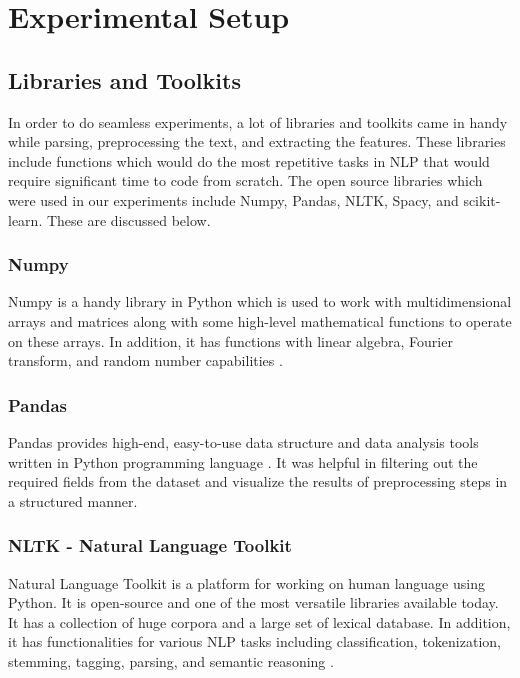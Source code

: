 

    \chapter{Experimental Setup}
    \label{chap:experiment_setup}
    \section{Libraries and Toolkits}
    
    In order to do seamless experiments, a lot of libraries and toolkits came in handy while parsing, preprocessing the text, and extracting the features. These libraries include functions which would do the most repetitive tasks in NLP that would require significant time to code from scratch. The open source libraries which were used in our experiments include Numpy, Pandas, NLTK, Spacy, and scikit-learn. These are discussed below.
    
    \subsection{Numpy}
    
    Numpy is a handy library in Python which is used to work with multidimensional arrays and matrices along with some high-level mathematical functions to operate on these arrays. In addition, it has functions with linear algebra, Fourier transform, and random number capabilities \cite{numpy}.
    
    \subsection{Pandas}
    
    Pandas provides high-end, easy-to-use data structure and data analysis tools written in Python programming language \cite{pandas}. It was helpful in filtering out the required fields from the dataset and visualize the results of preprocessing steps in a structured manner.  
    
    \subsection{NLTK - Natural Language Toolkit}
    
    Natural Language Toolkit is a platform for working on human language using Python. It is open-source and one of the most versatile libraries available today. It has a collection of huge corpora and a large set of lexical database. In addition, it has functionalities for various NLP tasks including classification, tokenization, stemming, tagging, parsing, and semantic reasoning \cite{nltk}.
    
